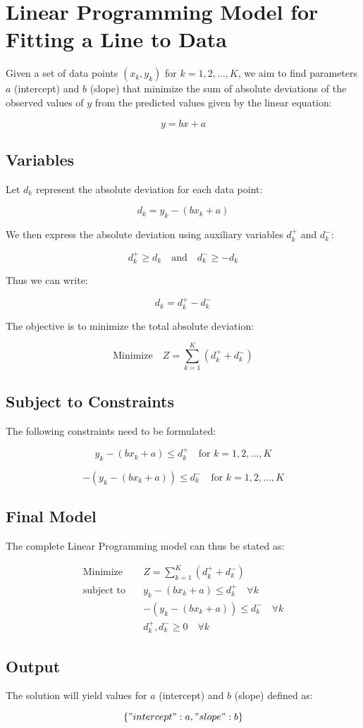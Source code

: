 \documentclass{article}
\begin{document}
\section*{Linear Programming Model for Fitting a Line to Data}

Given a set of data points \((x_k, y_k)\) for \(k = 1, 2, \ldots, K\), we aim to find parameters \(a\) (intercept) and \(b\) (slope) that minimize the sum of absolute deviations of the observed values of \(y\) from the predicted values given by the linear equation:

\[
y = bx + a
\]

\subsection*{Variables}
Let \(d_k\) represent the absolute deviation for each data point:

\[
d_k = y_k - (bx_k + a)
\]

We then express the absolute deviation using auxiliary variables \(d_k^+\) and \(d_k^-\):

\[
d_k^+ \geq d_k \quad \text{and} \quad d_k^- \geq -d_k
\]

Thus we can write:

\[
d_k = d_k^+ - d_k^-
\]

The objective is to minimize the total absolute deviation:

\[
\text{Minimize} \quad Z = \sum_{k=1}^{K} (d_k^+ + d_k^-)
\]

\subsection*{Subject to Constraints}
The following constraints need to be formulated:

\[
y_k - (bx_k + a) \leq d_k^+ \quad \text{for } k = 1, 2, \ldots, K
\]

\[
-(y_k - (bx_k + a)) \leq d_k^- \quad \text{for } k = 1, 2, \ldots, K
\]

\subsection*{Final Model}
The complete Linear Programming model can thus be stated as:

\[
\begin{align*}
\text{Minimize} \quad & Z = \sum_{k=1}^{K} (d_k^+ + d_k^-) \\
\text{subject to} \quad & y_k - (bx_k + a) \leq d_k^+ \quad \forall k \\
& -(y_k - (bx_k + a)) \leq d_k^- \quad \forall k \\
& d_k^+, d_k^- \geq 0 \quad \forall k
\end{align*}
\]

\subsection*{Output}
The solution will yield values for \(a\) (intercept) and \(b\) (slope) defined as:

\[
\{ "intercept": a, "slope": b \}
\]
\end{document}
